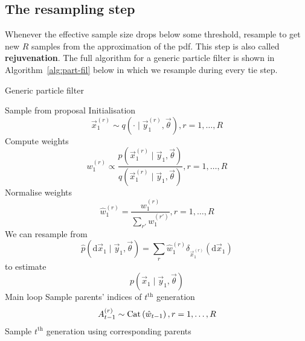 \subsection{The resampling step}
    Whenever the effective sample size drops below some threshold, resample to get new $R$ samples from the approximation of the pdf. This step is also called \textbf{rejuvenation}. The full algorithm for a generic particle filter is shown in Algorithm~\ref{alg:part-fil} below in which we resample during every tie step.
    \begin{algorithm}
    \caption{Generic particle filter}\label{alg:part-fil}
        \begin{algorithmic}[1]
            \State Sample from proposal \Comment Initialisation
                \begin{equation}
                    \vec x_1^{(r)} \sim q\left(\cdot \mid \vec y_1^{(r)}, \vec \theta\right), r = 1, \dotsc, R
                \end{equation}
            \State Compute weights
                \begin{equation}
                    w_1^{(r)} \propto \frac{p\left(\vec x_1^{(r)} \mid \vec y_1, \vec \theta\right)}{q\left(\vec x_1^{(r)} \mid \vec y_1, \vec \theta \right)}, r = 1, \dotsc, R
                \end{equation}
            \State Normalise weights
                \begin{equation}
                    \hat w_1^{(r)} = \frac{w_1^{(r)}}{\sum_{r'} w_1^{(r')}}, r = 1, \dotsc, R
                \end{equation}
            \State We can resample from 
                \begin{equation}
                    \hat p(\mathrm d \vec x_1 \mid \vec y_1, \vec \theta) = \sum_r \hat w_1^{(r)} \delta_{\vec x_1^{(r)}}(\mathrm d\vec x_1)
                \end{equation}
                to estimate
                \begin{equation}
                    p(\vec x_1 \mid \vec y_1, \vec \theta)
                \end{equation}
             \Comment Main loop
                \State Sample parents' indices of $t^{\text{th}}$ generation
                    \begin{equation}
                        A_{t - 1}^{(r)} \sim \operatorname{Cat}\left(\hat w_{t - 1}\right), r = 1, \dotsc, R
                    \end{equation}
                \State Sample $t^{\text{th}}$ generation using corresponding parents

\end{algorithmic}
\end{algorithm}
